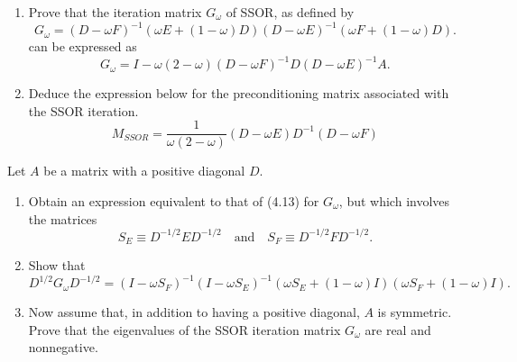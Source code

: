 \documentclass{ctexart}
\newif\ifpreface
\begin{document}
\large
\setlength{\baselineskip}{1.2em}
\ifpreface
    
\newgeometry{left=2cm,right=2cm,top=2cm,bottom=2cm}
\else
{}
\maketitle
\fi

\begin{problem} 
  \begin{enumerate}
    \item Prove that the iteration matrix \( G_{\omega} \) of SSOR, as defined by 
  \[
G_{\omega} = (D - \omega F)^{-1} (\omega E + (1 - \omega) D)
              (D - \omega E)^{-1} (\omega F + (1 - \omega) D).
  \]
  can be expressed as  
\[
G_{\omega} = I - \omega(2 - \omega)(D - \omega F)^{-1} D (D - \omega E)^{-1} A.
\]
\item Deduce the expression below for the preconditioning matrix associated with the SSOR iteration.
  \[
M_{SSOR} = \frac{1}{\omega (2 - \omega)} (D - \omega E) D^{-1} (D - \omega F)
\]
  \end{enumerate}
  
\end{problem}
 \begin{problem}
Let \(A\) be a matrix with a positive diagonal \(D\).

\begin{enumerate}[label=(\alph*)]
  \item Obtain an expression equivalent to that of (4.13) for \(G_{\omega}\), 
  but which involves the matrices
  \[
    S_E \equiv D^{-1/2} E D^{-1/2}
    \quad \text{and} \quad
    S_F \equiv D^{-1/2} F D^{-1/2}.
  \]

  \item Show that
  \[
    D^{1/2} G_{\omega} D^{-1/2}
    = (I - \omega S_F)^{-1} (I - \omega S_E)^{-1}
      (\omega S_E + (1 - \omega) I)
      (\omega S_F + (1 - \omega) I).
  \]

  \item Now assume that, in addition to having a positive diagonal, 
  \(A\) is symmetric.  
  Prove that the eigenvalues of the SSOR iteration matrix \(G_{\omega}\) 
  are real and nonnegative.
\end{enumerate}
\end{problem}
 
\end{document}
